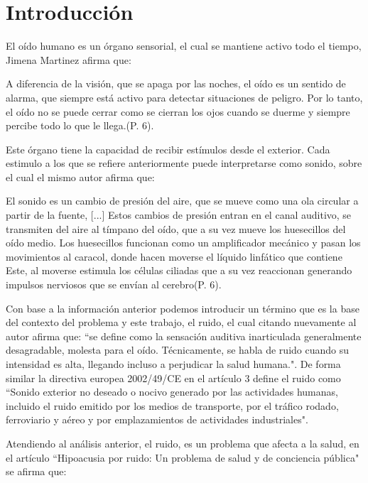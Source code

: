\chapter{Introducción}




El oído humano es un órgano sensorial, el cual se mantiene activo todo el tiempo, Jimena Martinez \cite{JimenaMartinezLlorente2015}
 afirma que:
 
A diferencia de la visión, que se apaga por las noches, el oído es un sentido de alarma, que siempre está activo para detectar situaciones de peligro. Por lo tanto, el oído no se puede cerrar como se cierran los ojos cuando se duerme y siempre percibe todo lo que le llega.(P. 6).
 
Este órgano tiene la capacidad de recibir estímulos desde el exterior. Cada estimulo a los que se refiere anteriormente puede interpretarse como sonido, sobre el cual el mismo autor afirma que: 

El sonido es un cambio de presión del aire, que se mueve como una ola circular a partir de la fuente, [...] Estos cambios de presión entran en el canal auditivo, se transmiten del aire al tímpano del oído, que a su vez mueve los huesecillos del oído medio. Los huesecillos funcionan como un amplificador mecánico y pasan los movimientos al caracol, donde hacen moverse el líquido linfático que contiene Este, al moverse estimula los células ciliadas que a su vez reaccionan generando impulsos nerviosos que se envían al cerebro(P. 6).

Con base a la información anterior podemos introducir un término que es la base del contexto del problema y este trabajo, el ruido, el cual citando nuevamente al autor afirma que: ``se define como la sensación auditiva inarticulada generalmente desagradable, molesta para el oído. Técnicamente, se habla de ruido cuando su intensidad es alta, llegando incluso a perjudicar la salud humana.". De forma similar la directiva europea 2002/49/CE \cite{EUROPEO2002} en el artículo 3 define el ruido como 
``Sonido exterior no deseado o nocivo generado por las actividades humanas, incluido el ruido emitido por los medios de transporte, por el tráfico rodado, ferroviario y aéreo y por emplazamientos de actividades industriales".

Atendiendo al análisis anterior, el ruido, es un problema que afecta a la salud, en el artículo ``Hipoacusia por ruido: Un problema de salud y de conciencia pública"\cite{Ugalde2000} se afirma que:

